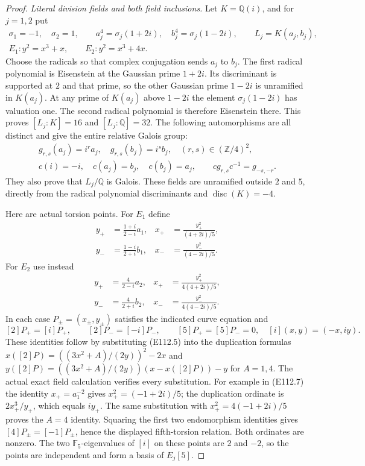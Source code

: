 \begin{proof}
\emph{Literal division fields and both field inclusions.}
Let $K=\mathbb Q(i)$, and for $j=1,2$ put
\[
 \begin{gathered}
 \sigma_1=-1,\quad\sigma_2=1,\qquad
 a_j^4=\sigma_j(1+2i),\quad b_j^4=\sigma_j(1-2i),\qquad
 L_j=K(a_j,b_j),\\
 E_1:y^2=x^3+x,\qquad E_2:y^2=x^3+4x.
 \end{gathered}
 \tag{E112.5}
\]
Choose the radicals so that complex conjugation sends $a_j$ to
$b_j$.  The first radical polynomial is Eisenstein at the
Gaussian prime $1+2i$.  Its discriminant is supported at $2$
and that prime, so the other Gaussian prime $1-2i$ is unramified
in $K(a_j)$.  At any prime of $K(a_j)$ above $1-2i$ the element
$\sigma_j(1-2i)$ has valuation one.  The second radical polynomial
is therefore Eisenstein there.  This proves
$[L_j:K]=16$ and $[L_j:\mathbb Q]=32$.
The following automorphisms are all distinct and give the entire
relative Galois group:
\[
 \begin{gathered}
 g_{r,s}(a_j)=i^ra_j,\quad g_{r,s}(b_j)=i^sb_j,
       \quad(r,s)\in(\mathbb Z/4)^2,\\
 c(i)=-i,\quad c(a_j)=b_j,\quad c(b_j)=a_j,
       \qquad c g_{r,s}c^{-1}=g_{-s,-r}.
 \end{gathered}
 \tag{E112.6}
\]
They also prove that $L_j/\mathbb Q$ is Galois.  These fields are
unramified outside $2$ and $5$, directly from the radical
polynomial discriminants and $\operatorname{disc}(K)=-4$.

Here are actual torsion points.  For $E_1$ define
\[
 \begin{aligned}
 y_+&=\frac{1+i}{2-i}a_1,&
 x_+&=\frac{y_+^2}{(4+2i)/5},\\
 y_-&=\frac{1-i}{2+i}b_1,&
 x_-&=\frac{y_-^2}{(4-2i)/5}.
 \end{aligned}
 \tag{E112.7}
\]
For $E_2$ use instead
\[
 \begin{aligned}
 y_+&=\frac4{2-i}a_2,&
 x_+&=\frac{y_+^2}{4(4+2i)/5},\\
 y_-&=\frac4{2+i}b_2,&
 x_-&=\frac{y_-^2}{4(4-2i)/5}.
 \end{aligned}
 \tag{E112.8}
\]
In each case $P_\pm=(x_\pm,y_\pm)$ satisfies the indicated
curve equation and
\[
 [2]P_+=[i]P_+,\qquad [2]P_-=[-i]P_-,\qquad
             [5]P_+=[5]P_-=0,
 \quad [i](x,y)=(-x,iy).
 \tag{E112.9}
\]
These identities follow by substituting (E112.5) into the
duplication formulas
$x([2]P)=((3x^2+A)/(2y))^2-2x$ and
$y([2]P)=((3x^2+A)/(2y))(x-x([2]P))-y$ for $A=1,4$.
The actual exact field calculation verifies every substitution.
For example in (E112.7) the identity $x_+=a_1^{-2}$ gives
$x_+^2=(-1+2i)/5$; the duplication ordinate is $2x_+^3/y_+$,
which equals $iy_+$.  The same substitution with
$x_+^2=4(-1+2i)/5$ proves the $A=4$ identity.
Squaring the first two endomorphism identities gives
$[4]P_\pm=[-1]P_\pm$, hence the displayed fifth-torsion relation.
Both ordinates are nonzero.  The two $\mathbb F_5$-eigenvalues
of $[i]$ on these points are $2$ and $-2$, so the points are
independent and form a basis of $E_j[5]$.


\end{proof}
